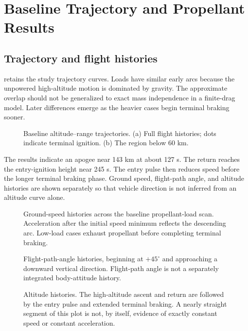 \documentclass[11pt,a4paper]{article}
\begin{document}
\section{Baseline Trajectory and Propellant Results}
\subsection{Trajectory and flight histories}
 retains the study trajectory curves. Loads have similar early arcs because the unpowered high-altitude motion is dominated by gravity. The approximate overlap should not be generalized to exact mass independence in a finite-drag model. Later differences emerge as the heavier cases begin terminal braking sooner.

\begin{figure}[htbp]
\centering\SourceTrajectory
\caption{Baseline altitude--range trajectories. (a) Full flight histories; dots indicate terminal ignition. (b) The region below 60 km.}
\label{fig:trajectory}
\end{figure}

The results indicate an apogee near 143 km at about 127 s. The return reaches the entry-ignition height near 245 s. The entry pulse then reduces speed before the longer terminal braking phase. Ground speed, flight-path angle, and altitude histories are shown separately so that vehicle direction is not inferred from an altitude curve alone.

\begin{figure}[htbp]
\centering{}
\caption{Ground-speed histories across the baseline propellant-load scan. Acceleration after the initial speed minimum reflects the descending arc. Low-load cases exhaust propellant before completing terminal braking.}
\label{fig:speed}
\end{figure}

\begin{figure}[htbp]
\centering{}
\caption{Flight-path-angle histories, beginning at $+45^\circ$ and approaching a downward vertical direction. Flight-path angle is not a separately integrated body-attitude history.}
\label{fig:gamma}
\end{figure}

\begin{figure}[htbp]
\centering{}
\caption{Altitude histories. The high-altitude ascent and return are followed by the entry pulse and extended terminal braking. A nearly straight segment of this plot is not, by itself, evidence of exactly constant speed or constant acceleration.}
\label{fig:height}
\end{figure}
\end{document}
